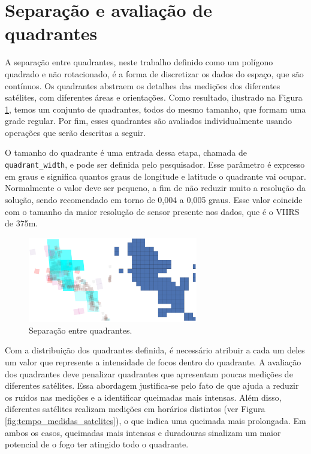\documentclass[cic,tc]{iiufrgs}
\begin{document}
\section{Separação e avaliação de quadrantes}
\label{sec:separacao_e_avaliacao}

A separação entre quadrantes, neste trabalho definido como um polígono quadrado e não rotacionado, é a forma de discretizar os dados do espaço, que são contínuos. Os quadrantes abstraem os detalhes das medições dos diferentes satélites, com diferentes áreas e orientações. Como resultado, ilustrado na Figura \ref{fig:satellite_quads_split}, temos um conjunto de quadrantes, todos do mesmo tamanho, que formam uma grade regular. Por fim, esses quadrantes são avaliados individualmente usando operações que serão descritas a seguir. 

O tamanho do quadrante é uma entrada dessa etapa, chamada de \texttt{quadrant\_width}, e pode ser definida pelo pesquisador. Esse parâmetro é expresso em graus e significa quantos graus de longitude e latitude o quadrante vai ocupar. Normalmente o valor deve ser pequeno, a fim de não reduzir muito a resolução da solução, sendo recomendado em torno de 0,004 a 0,005 graus. Esse valor coincide com o tamanho da maior resolução de sensor presente nos dados, que é o VIIRS de 375m.

\begin{figure}[!htb]
    \caption{Separação entre quadrantes.}
    \begin{center}
        \includegraphics[width=20em]{satellite_quads_split}
    \end{center}
    \label{fig:satellite_quads_split}
\end{figure}

Com a distribuição dos quadrantes definida, é necessário atribuir a cada um deles um valor que represente a intensidade de focos dentro do quadrante. A avaliação dos quadrantes deve penalizar quadrantes que apresentam poucas medições de diferentes satélites. Essa abordagem justifica-se pelo fato de que ajuda a reduzir os ruídos nas medições e a identificar queimadas mais intensas. Além disso, diferentes satélites realizam medições em horários distintos (ver Figura \ref{fig:tempo_medidas_satelites}), o que indica uma queimada mais prolongada. Em ambos os casos, queimadas mais intensas e duradouras sinalizam um maior potencial de o fogo ter atingido todo o quadrante.
\end{document}
